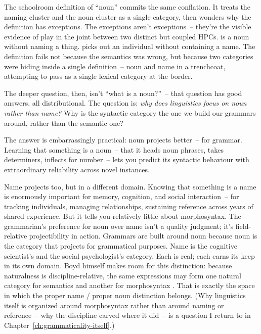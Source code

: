 The schoolroom definition of \enquote{noun} commits the same conflation. It treats the naming cluster and the noun cluster as a single category, then wonders why the definition has exceptions. The exceptions aren't exceptions~-- they're the visible evidence of play in the joint between two distinct but coupled HPCs.  is a noun without naming a thing.  picks out an individual without containing a name. The definition fails not because the semantics was wrong, but because two categories were hiding inside a single definition~-- noun and name in a trenchcoat, attempting to pass as a single lexical category at the border.

The deeper question, then, isn't \enquote{what is a noun?}~-- that question has good answers, all distributional. The question is: \emph{why does linguistics focus on noun rather than name?} Why is the syntactic category the one we build our grammars around, rather than the semantic one?

The answer is embarrassingly practical: noun projects better~-- for grammar. Learning that something is a noun~-- that it heads noun phrases, takes determiners, inflects for number~-- lets you predict its syntactic behaviour with extraordinary reliability across novel instances.

Name projects too, but in a different domain. Knowing that something is a name is enormously important for memory, cognition, and social interaction~-- for tracking individuals, managing relationships, sustaining reference across years of shared experience. But it tells you relatively little about morphosyntax. The grammarian's preference for noun over name isn't a quality judgment; it's field-relative projectibility in action. Grammars are built around noun because noun is the category that projects for grammatical purposes. Name is the cognitive scientist's and the social psychologist's category. Each is real; each earns its keep in its own domain. Boyd himself makes room for this distinction: because naturalness is discipline-relative, the same expressions may form one natural category for semantics and another for morphosyntax \parencite[147]{boyd1999}. That is exactly the space in which the proper name / proper noun distinction belongs. (Why linguistics itself is organized around morphosyntax rather than around naming or reference~-- why the discipline carved where it did~-- is a question I return to in Chapter~\ref{ch:grammaticality-itself}.)

